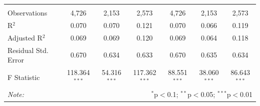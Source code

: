 \documentclass[alpha-refs]{wiley-article-01g}
\begin{document}
\begin{landscape}
\begin{table}[!htbp]
\begin{tabular}{@{\extracolsep{5pt}}lcccccc}
			& & & & & & \\ 
			\hline \\[-.8ex] 
			Observations & 4,726 & 2,153 & 2,573 & 4,726 & 2,153 & 2,573 \\ 
			R$^{2}$ & 0.070 & 0.070 & 0.121 & 0.070 & 0.066 & 0.119 \\ 
			Adjusted R$^{2}$ & 0.069 & 0.069 & 0.120 & 0.069 & 0.064 & 0.118 \\ 
			Residual Std. Error & 0.670 & 0.634 & 0.633 & 0.670 & 0.635 & 0.634 \\ 
			F Statistic & 118.364$^{***}$ & 54.316$^{***}$ & 117.362$^{***}$ & 88.551$^{***}$ & 38.060$^{***}$ & 86.643$^{***}$ \\ 
			\hline 
			\textit{Note:}  & \multicolumn{6}{r}{$^{*}$p$<$0.1; $^{**}$p$<$0.05; $^{***}$p$<$0.01} \\ 
		\end{tabular} 
	\end{table} 
	
\end{landscape}

\newpage
\end{document}
